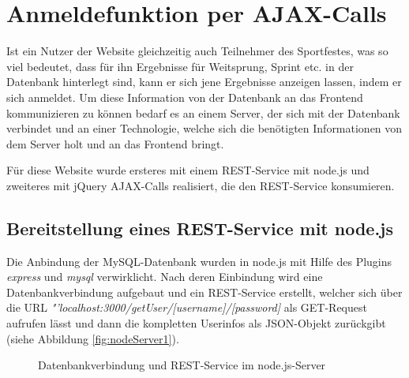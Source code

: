 \section{Anmeldefunktion per AJAX-Calls}
\label{Anmeldefunktion per AJAX-Calls}
Ist ein Nutzer der Website gleichzeitig auch Teilnehmer des Sportfestes, was so viel bedeutet, dass für ihn Ergebnisse für Weitsprung, Sprint etc. in der Datenbank hinterlegt sind, kann er sich jene Ergebnisse anzeigen lassen, indem er sich anmeldet. Um diese Information von der Datenbank an das Frontend kommunizieren zu können bedarf es an einem Server, der sich mit der Datenbank verbindet und an einer Technologie, welche sich die benötigten Informationen von dem Server holt und an das Frontend bringt. 
\par
Für diese Website wurde ersteres mit einem REST-Service mit node.js und zweiteres mit jQuery AJAX-Calls realisiert, die den REST-Service konsumieren.

\subsection{Bereitstellung eines REST-Service mit node.js}
\label{Bereitstellung eines REST-Service mit node.js}
Die Anbindung der MySQL-Datenbank wurden in node.js mit Hilfe des Plugins \textit{express} und \textit{mysql} verwirklicht. Nach deren Einbindung wird eine Datenbankverbindung aufgebaut und ein REST-Service erstellt, welcher sich über die URL \textit{"'localhost:3000/getUser/[username]/[password]} als GET-Request aufrufen lässt und dann die kompletten Userinfos als JSON-Objekt zurückgibt (siehe Abbildung \vref{fig:nodeServer1}).

\begin{figure}[!h]
	\caption{Datenbankverbindung und REST-Service im node.js-Server}
	\label{fig:nodeServer1}
\end{figure}

